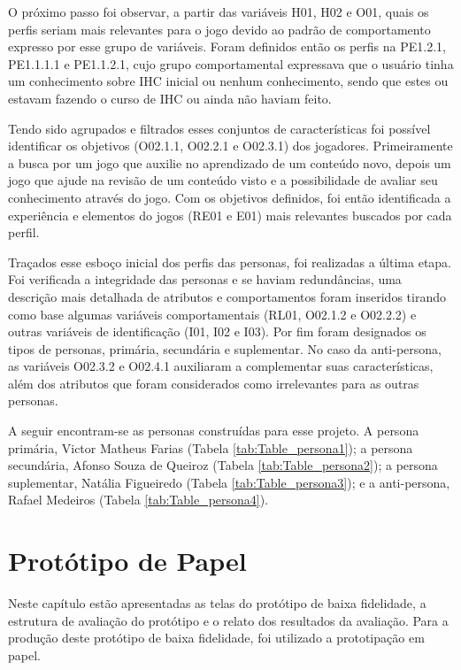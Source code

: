 \begin{apendicesenv}
O próximo passo foi observar, a partir das variáveis H01, H02 e O01, quais os perfis seriam mais relevantes para o jogo devido ao padrão de comportamento expresso por esse grupo de variáveis. Foram definidos então os perfis na PE1.2.1, PE1.1.1.1 e PE1.1.2.1, cujo grupo comportamental expressava que o usuário tinha um conhecimento sobre IHC inicial ou nenhum conhecimento, sendo que estes ou estavam fazendo o curso de IHC ou ainda não haviam feito.

Tendo sido agrupados e filtrados esses conjuntos de características foi possível identificar os objetivos (O02.1.1, O02.2.1 e O02.3.1) dos jogadores. Primeiramente a busca por um jogo que auxilie no aprendizado de um conteúdo novo, depois um jogo que ajude na revisão de um conteúdo visto e a possibilidade de avaliar seu conhecimento através do jogo. Com os objetivos definidos, foi então identificada a experiência e elementos do jogos (RE01 e E01) mais relevantes buscados por cada perfil. %

Traçados esse esboço inicial dos perfis das personas, foi realizadas a última etapa. Foi verificada a integridade das personas e se haviam redundâncias, uma descrição mais detalhada de atributos e comportamentos foram inseridos tirando como base algumas variáveis comportamentais (RL01, O02.1.2 e O02.2.2) e outras variáveis de identificação (I01, I02 e I03). Por fim foram designados os tipos de personas, primária, secundária e suplementar. No caso da anti-persona, as variáveis O02.3.2 e O02.4.1 auxiliaram a complementar suas características, além dos atributos que foram considerados como irrelevantes para as outras personas.

A seguir encontram-se as personas construídas para esse projeto. A persona primária, Victor Matheus Farias (Tabela \ref{tab:Table_persona1}); a persona secundária, Afonso Souza de Queiroz (Tabela \ref{tab:Table_persona2}); a persona suplementar, Natália Figueiredo (Tabela \ref{tab:Table_persona3}); e a anti-persona, Rafael Medeiros (Tabela \ref{tab:Table_persona4}).
\newpage






\chapter{Protótipo de Papel}
\label{ap:proto_papel}

{\color{textmodified}
Neste capítulo estão apresentadas as telas do protótipo de baixa fidelidade, a estrutura de avaliação do protótipo e o relato dos resultados da avaliação. Para a produção deste protótipo de baixa fidelidade, foi utilizado a prototipação em papel.
}


\end{apendicesenv}
